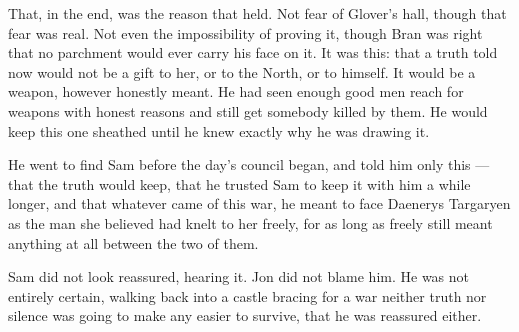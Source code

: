 That, in the end, was the reason that held. Not fear of Glover’s hall, though that fear was real. Not even the impossibility of proving it, though Bran was right that no parchment would ever carry his face on it. It was this: that a truth told now would not be a gift to her, or to the North, or to himself. It would be a weapon, however honestly meant. He had seen enough good men reach for weapons with honest reasons and still get somebody killed by them. He would keep this one sheathed until he knew exactly why he was drawing it.

He went to find Sam before the day’s council began, and told him only this — that the truth would keep, that he trusted Sam to keep it with him a while longer, and that whatever came of this war, he meant to face Daenerys Targaryen as the man she believed had knelt to her freely, for as long as freely still meant anything at all between the two of them.

Sam did not look reassured, hearing it. Jon did not blame him. He was not entirely certain, walking back into a castle bracing for a war neither truth nor silence was going to make any easier to survive, that he was reassured either.